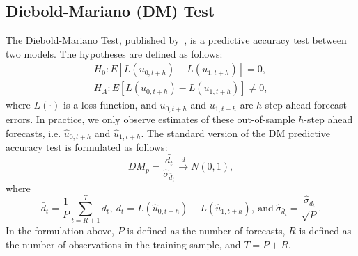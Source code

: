 \subsection{Diebold-Mariano (DM) Test}
\label{sec:dmtest}
The Diebold-Mariano Test, published by~\textcite[hereafter DM]{Diebold1994}, is a predictive accuracy test between two models. The hypotheses are defined as follows:
\begin{align*}
	H_0 : E\left[L(u_{0,t+h}) - L(u_{1,t+h})\right] = 0, \\
	H_A : E\left[L(u_{0,t+h}) - L(u_{1,t+h})\right] \neq 0,
\end{align*}
where $L(\cdot)$ is a loss function, and $u_{0,t+h}$ and $u_{1,t+h}$ are $h$-step ahead forecast errors. In practice, we only observe estimates of these out-of-sample $h$-step ahead forecasts, i.e. $\hat{u}_{0,t+h}$ and $\hat{u}_{1,t+h}$. The standard version of the DM predictive accuracy test is formulated as follows:
\begin{equation}
	DM_p = \frac{\bar{d_t}}{\hat{\sigma}_{\bar{d}_t}} \overset{d}{\rightarrow} N(0,1),
\end{equation}
where
\begin{equation}
	\bar{d}_t = \frac{1}{P} \sum_{t=R+1}^{T} d_t,\ d_t = L(\hat{u}_{0,t+h}) - L(\hat{u}_{1,t+h}),\ \text{and}\ \hat{\sigma}_{\bar{d}_t} = \frac{\hat{\sigma}_{d_t}}{\sqrt{P}}.
\end{equation}
In the formulation above, $P$ is defined as the number of forecasts, $R$ is defined as the number of observations in the training sample, and $T = P + R$. 
